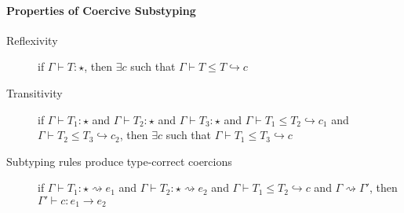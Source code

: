 



\paragraph{Properties of Coercive Substyping}

\begin{description}
\item[{Reflexivity}] if $\Gamma \vdash T : \star$, then $\exists c$
  such that $\Gamma \vdash T \leq T \hookrightarrow c$
\item[{Transitivity}] if $\Gamma \vdash T_1 : \star$ and $\Gamma
  \vdash T_2 : \star$ and $\Gamma \vdash T_3 : \star$ and $\Gamma
  \vdash T_1 \leq T_2 \hookrightarrow c_1$ and $\Gamma \vdash T_2 \leq T_3
  \hookrightarrow c_2$, then $\exists c$ such that $\Gamma \vdash T_1
  \leq T_3 \hookrightarrow c$
\item[{Subtyping rules produce type-correct coercions}] if $\Gamma
  \vdash T_1 : \star \rightsquigarrow e_1$ and $\Gamma \vdash T_2 :
  \star \rightsquigarrow e_2$ and $\Gamma \vdash T_1 \leq T_2
  \hookrightarrow c$ and $\Gamma \rightsquigarrow \Gamma'$, then
  $\Gamma' \vdash c : e_1 \rightarrow e_2$
\end{description}








